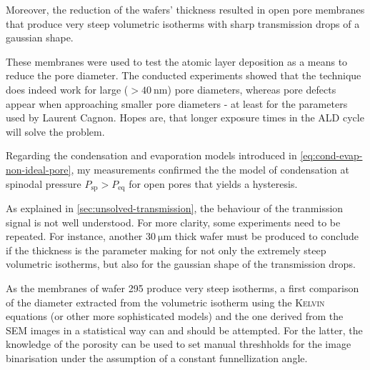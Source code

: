 \documentclass[../thesis.tex]{subfiles}
\begin{document}
    Moreover, the reduction of the wafers' thickness resulted in open pore membranes that produce very steep volumetric isotherms with sharp transmission drops of a gaussian shape.

    These membranes were used to test the atomic layer deposition as a means to reduce the pore diameter. The conducted experiments showed that the technique does indeed work for large ($>\SI{40}{\nano\meter}$) pore diameters, whereas pore defects appear when approaching smaller pore diameters - at least for the parameters used by Laurent Cagnon. Hopes are, that longer exposure times in the ALD cycle will solve the problem.

    Regarding the condensation and evaporation models introduced in \cref{eq:cond-evap-non-ideal-pore}, my measurements confirmed the the model of condensation at spinodal pressure $P_\mathrm{sp}>P_\mathrm{eq}$ for open pores that yields a hysteresis.
    \medskip

    As explained in \cref{sec:unsolved-transmission}, the behaviour of the tranmission signal is not well understood. For more clarity, some experiments need to be repeated.  For instance, another $\SI{30}{\micro\meter}$ thick wafer must be produced to conclude if the thickness is the parameter making for not only the extremely steep volumetric isotherms, but also for the gaussian shape of the transmission drops.
    \medskip


    As the membranes of wafer 295 produce very steep isotherms, a first comparison of the diameter extracted from the volumetric isotherm using the \textsc{Kelvin} equations (or other more sophisticated models) and the one derived from the SEM images in a statistical way can and should be attempted. For the latter, the knowledge of the porosity can be used to set manual threshholds for the image binarisation under the assumption of a constant funnellization angle.
\end{document}
